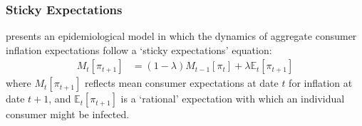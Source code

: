 \subsubsection{Sticky Expectations}



\cite{carroll2003macroeconomic} presents an epidemiological model in which the dynamics of aggregate consumer inflation expectations follow a `sticky expectations' equation:
    \begin{align}
        M_{t}[\pi_{t+1}] & = (1-\lambda)M_{t-1}[\pi_{t}]+\lambda \mathbb{E}_{t}[\pi_{t+1}] \label{eq:StickyExp}
    \end{align}
where $M_{t}[\pi_{t+1}]$ reflects mean consumer expectations at date $t$ for inflation at date $t+1$, and $\mathbb{E}_{t}[\pi_{t+1}]$ is a `rational' expectation with which an individual consumer might be infected.



